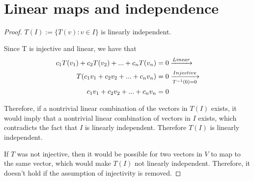 \section{Linear maps and independence}
\begin{proof} $T(I) := \{T(v):v \in I\}$ is linearly independent.\gap

    Since T is injective and linear, we have that 
    \begin{align*}
        c_1T(v_1) + c_2T(v_2) + ... + c_nT(v_n) = 0 &\xrightarrow{Linear} \\ 
        T(c_1v_1 + c_2v_2 + ... + c_nv_n) = 0 &\xrightarrow[T^{-1}(0)=0]{Injective} \\
        c_1v_1 + c_2v_2 + ... + c_nv_n = 0
    \end{align*}
     

    Therefore, if a nontrivial linear combination of the vectors in $T(I)$ exists,
    it would imply that a nontrivial linear combination of vectors in $I$ exists,
    which contradicts the fact that $I$ is linearly independent.
    Therefore $T(I)$ is linearly independent.\gap

    If $T$ was not injective, then it would be possible for 
    two vectors in $V$ to map to the same vector, 
    which would make $T(I)$ not linearly independent.
    Therefore, it doesn't hold if the assumption of injectivity is removed.
\end{proof}